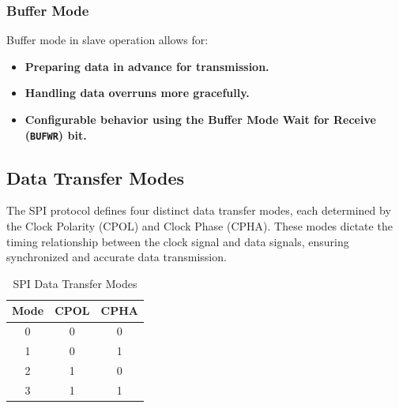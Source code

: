 \subsubsection{Buffer Mode}
Buffer mode in slave operation allows for:

\begin{itemize}
    \item \textbf{Preparing data in advance for transmission.}
    \item \textbf{Handling data overruns more gracefully.}
    \item \textbf{Configurable behavior using the Buffer Mode Wait for Receive (\texttt{BUFWR}) bit.}
\end{itemize}


\subsection{Data Transfer Modes}
The SPI protocol defines four distinct data transfer modes, each determined by the Clock Polarity (CPOL) and Clock Phase (CPHA). These modes dictate the timing relationship between the clock signal and data signals, ensuring synchronized and accurate data transmission.

\begin{table}[H]
    \centering
    \caption{SPI Data Transfer Modes}
    \begin{tabular}{@{}ccc@{}}
        \toprule
        \textbf{Mode} & \textbf{CPOL} & \textbf{CPHA} \\ \midrule
        0 & 0 & 0 \\
        1 & 0 & 1 \\
        2 & 1 & 0 \\
        3 & 1 & 1 \\ \bottomrule
    \end{tabular}
    \label{tab:spi_modes}
\end{table}

